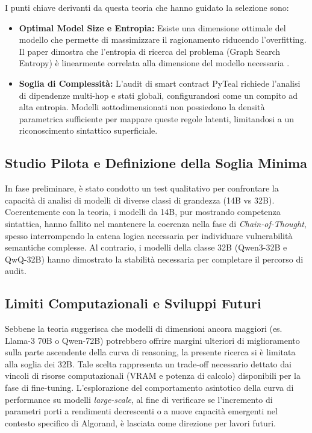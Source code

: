 I punti chiave derivanti da questa teoria che hanno guidato la selezione sono:
\begin{itemize}
    \item \textbf{Optimal Model Size e Entropia:} Esiste una dimensione ottimale del modello che permette di massimizzare il ragionamento riducendo l'overfitting. Il paper dimostra che l'entropia di ricerca del problema (Graph Search Entropy) è linearmente correlata alla dimensione del modello necessaria \cite{wang2025larger}. 
    \item \textbf{Soglia di Complessità:} L'audit di smart contract PyTeal richiede l'analisi di dipendenze multi-hop e stati globali, configurandosi come un compito ad alta entropia. Modelli sottodimensionati non possiedono la densità parametrica sufficiente per mappare queste regole latenti, limitandosi a un riconoscimento sintattico superficiale.
\end{itemize}

\subsection{Studio Pilota e Definizione della Soglia Minima}
In fase preliminare, è stato condotto un test qualitativo per confrontare la capacità di analisi di modelli di diverse classi di grandezza (14B vs 32B). 
Coerentemente con la teoria, i modelli da 14B, pur mostrando competenza sintattica, hanno fallito nel mantenere la coerenza nella fase di \textit{Chain-of-Thought}, spesso interrompendo la catena logica necessaria per individuare vulnerabilità semantiche complesse. Al contrario, i modelli della classe 32B (Qwen3-32B e QwQ-32B) hanno dimostrato la stabilità necessaria per completare il percorso di audit.

\subsection{Limiti Computazionali e Sviluppi Futuri}
Sebbene la teoria suggerisca che modelli di dimensioni ancora maggiori (es. Llama-3 70B o Qwen-72B) potrebbero offrire margini ulteriori di miglioramento sulla parte ascendente della curva di reasoning, la presente ricerca si è limitata alla soglia dei 32B.
Tale scelta rappresenta un trade-off necessario dettato dai vincoli di risorse computazionali (VRAM e potenza di calcolo) disponibili per la fase di fine-tuning. L'esplorazione del comportamento asintotico della curva di performance su modelli \textit{large-scale}, al fine di verificare se l'incremento di parametri porti a rendimenti decrescenti o a nuove capacità emergenti nel contesto specifico di Algorand, è lasciata come direzione per lavori futuri.


